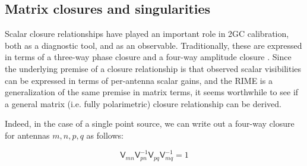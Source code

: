 \documentclass[]{aa}
\newcommand{\jones}[2]{\vec {#1}_{#2}}
\newcommand{\coh}[2]{\mathsf{{#1}}_{{#2}}}
\begin{document}
% 
% 
% 
% 
% 

\subsection{Matrix closures and singularities\label{sec:closures}}

Scalar closure relationships have played an important role in 2GC calibration, both as a diagnostic tool, and as an observable. Traditionally, these are expressed in terms of a three-way phase closure and a four-way amplitude closure \citep[see e.g.][Sect.~10.3]{tms}. Since the underlying premise of a closure relationship is that observed scalar visibilities can be expressed in terms of per-antenna scalar gains, and the RIME is a generalization of the same premise in matrix terms, it seems worthwhile to see if a general matrix (i.e. fully polarimetric) closure relationship can be derived.

Indeed, in the case of a single point source, we can write out a four-way closure for antennas $m,n,p,q$ as follows:

\begin{equation}\label{eq:closure}
\coh{V}{mn}\coh{V}{pn}^{-1}\coh{V}{pq}\coh{V}{mq}^{-1} = 1
\end{equation}
\end{document}
